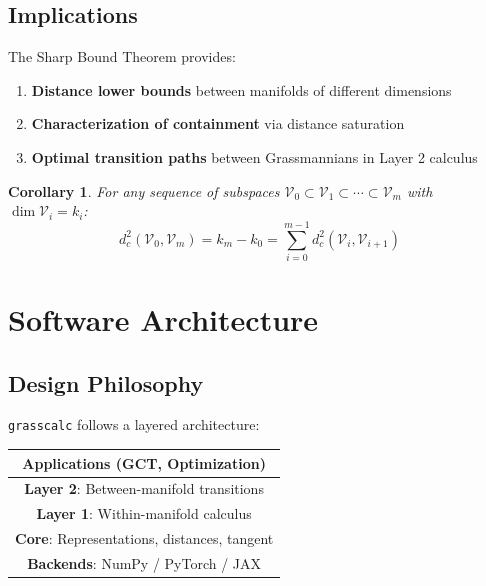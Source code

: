 \documentclass[11pt,a4paper]{article}
\newtheorem{corollary}[theorem]{Corollary}
\begin{document}
\subsection{Implications}

The Sharp Bound Theorem provides:

\begin{enumerate}
    \item \textbf{Distance lower bounds} between manifolds of different dimensions
    \item \textbf{Characterization of containment} via distance saturation
    \item \textbf{Optimal transition paths} between Grassmannians in Layer 2 calculus
\end{enumerate}

\begin{corollary}
For any sequence of subspaces $\mathcal{V}_0 \subset \mathcal{V}_1 \subset \cdots \subset \mathcal{V}_m$ with $\dim\mathcal{V}_i = k_i$:
\begin{equation}
    d_c^2(\mathcal{V}_0, \mathcal{V}_m) = k_m - k_0 = \sum_{i=0}^{m-1} d_c^2(\mathcal{V}_i, \mathcal{V}_{i+1})
\end{equation}
\end{corollary}

\section{Software Architecture}
\label{sec:architecture}

\subsection{Design Philosophy}

\texttt{grasscalc} follows a layered architecture:

\begin{center}
\begin{tabular}{|c|}
\hline
\textbf{Applications} (GCT, Optimization) \\
\hline
\textbf{Layer 2}: Between-manifold transitions \\
\hline
\textbf{Layer 1}: Within-manifold calculus \\
\hline
\textbf{Core}: Representations, distances, tangent \\
\hline
\textbf{Backends}: NumPy / PyTorch / JAX \\
\hline
\end{tabular}
\end{center}
\end{document}
